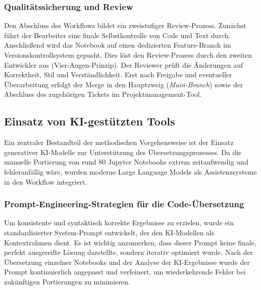 \subsubsection{Qualitätssicherung und Review}
Den Abschluss des Workflows bildet ein zweistufiger Review-Prozess. Zunächst führt der Bearbeiter eine finale Selbstkontrolle von Code und Text durch. Anschließend wird das Notebook auf einen dedizierten Feature-Branch im Versionskontrollsystem gepusht. Dies löst den Review-Prozess durch den zweiten Entwickler aus (Vier-Augen-Prinzip). Der Reviewer prüft die Änderungen auf Korrektheit, Stil und Verständlichkeit. Erst nach Freigabe und eventueller Überarbeitung erfolgt der Merge in den Hauptzweig (\textit{Main-Branch}) sowie der Abschluss des zugehörigen Tickets im Projektmanagement-Tool.


\subsection{Einsatz von KI-gestützten Tools}
\label{subsec:ki-tools}
Ein zentraler Bestandteil der methodischen Vorgehensweise ist der  Einsatz generativer KI-Modelle zur Unterstützung des Übersetzungsprozesses. Da die manuelle Portierung von rund 80 Jupyter Notebooks extrem zeitaufwendig und fehleranfällig wäre, wurden moderne Large Language Models als Assistenzsysteme in den Workflow integriert.

\subsubsection{Prompt-Engineering-Strategien für die Code-Übersetzung}
Um konsistente und syntaktisch korrekte Ergebnisse zu erzielen, wurde ein standardisierter System-Prompt entwickelt, der den \ac{KI}-Modellen als Kontextrahmen dient. Es ist wichtig anzumerken, dass dieser Prompt keine finale, perfekt ausgereifte Lösung darstellte, sondern iterativ optimiert wurde. Nach der Übersetzung einzelner Notebooks und der Analyse der \ac{KI}-Ergebnisse wurde der Prompt kontinuierlich angepasst und verfeinert, um wiederkehrende Fehler bei zukünftigen Portierungen zu minimieren. 

